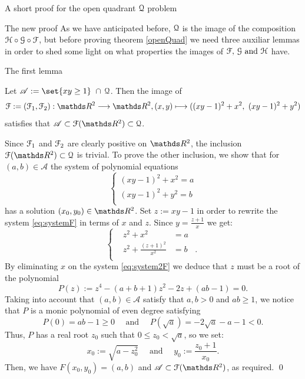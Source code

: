 \documentclass[11pt, a4paper, english, twoside, notitlepage, openright]{report}
\begin{document}
\begin{chapter}{A short proof for the open quadrant $\mathcal{Q}$ problem}
\begin{section}{The new proof}
As we have anticipated before, $\mathcal{Q}$ is the image of the composition $\mathcal{H} \circ \mathcal{G} \circ \mathcal{F}$, but before proving theorem \ref{openQuad} we need three auxiliar lemmas in order to shed some light on what properties the images of $\mathcal{F},\, \mathcal{G} \text { and }\mathcal{H}$ have.

\begin{subsection}{The first lemma}
\begin{lemma}\label{lemma1}
Let $\mathscr{A} := \set{xy \ge 1}\ \cap\, \Qu$. Then the image of 
$$
\FF := (\FF_1, \FF_2): \R^2 \longrightarrow \R^2, (x, y) \longmapsto ((xy - 1)^2 + x^2,\ (xy - 1)^2 + y^2)
$$
satisfies that $\mathscr{A} \subset \FF(\R^2) \subset \Qu$.
\begin{Proof}
Since $\mathcal{F}_1$ and $\mathcal{F}_2$ are clearly positive on $\R^2$, the inclusion $\FF(\R^2) \subset \Qu$ is trivial. To prove the other inclusion, we show that for $(a,b) \in \mathscr{A}$ the system of polynomial equations
\begin{equation}\label{eq:systemF}
\left\{
\begin{aligned}
(xy - 1)^2 + x^2 = a\\
(xy - 1)^2 + y^2 = b\\
\end{aligned}
\right.
\end{equation}
has a solution $(x_0, y_0) \in \R^2$. Set $z := xy - 1$ in order to rewrite the system \ref{eq:systemF} in terms of $x$ and $z$. Since $y = \frac{z + 1}{x}$ we get:
\begin{equation}\label{eq:system2F}
\left\{
\begin{aligned}
&z^2 + x^2 &= a\\
&z^2 + \frac{(z + 1)^2}{x^2} &= b&.\\
\end{aligned}
\right.
\end{equation}
By eliminating $x$ on the system \ref{eq:system2F} we deduce that $z$ must be a root of the polynomial
$$
P(z) := z^4 - (a + b + 1)z^2 - 2z + (ab - 1) = 0.
$$
Taking into account that $(a, b) \in \mathscr{A}$ satisfy that $a, b > 0$ and $ab \ge 1$, we notice that $P$ is a monic polynomial of even degree satisfying
$$
P(0) = ab - 1 \ge 0\quad \text{ and }\quad P(\sqrt{a}) = -2 \sqrt{a} - a - 1 < 0.
$$
Thus, $P$ has a real root $z_0$ such that $0 \le z_0 < \sqrt{a}$, so we set:
$$
x_0 := \sqrt{a - z_0^2} \quad \text{ and } \quad y_0 := \frac{z_0 + 1}{x_0}.
$$
Then, we have $F(x_0, y_0) = (a, b)$ and $\mathscr{A} \subset \FF(\R^2)$, as required.
\qed
\end{Proof}
\end{lemma}
\end{subsection}


\end{section}
\end{chapter}
\end{document}
